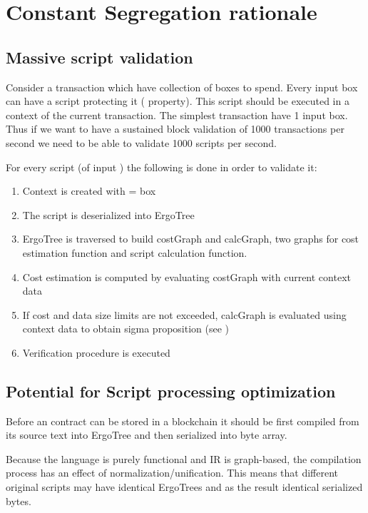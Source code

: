 \section{Constant Segregation rationale}

\subsection{Massive script validation}

Consider a transaction  which have  collection of boxes to
spend. Every input box can have a script protecting it (
property). This script should be executed in a context of the current
transaction. The simplest transaction have 1 input box. Thus if we want to
have a sustained block validation of 1000 transactions per second we need to
be able to validate 1000 scripts per second.

For every script (of input ) the following is done in order to
validate it:
\begin{enumerate}
    \item Context is created with  = box
    \item The script is deserialized into ErgoTree 
    \item ErgoTree is traversed to build costGraph and calcGraph, two graphs for
    cost estimation function and script calculation function.
    \item Cost estimation is computed by evaluating costGraph with current context data
    \item If cost and data size limits are not exceeded, calcGraph is
    evaluated using context data to obtain sigma proposition (see
    \hyperref[sec:type:SigmaProp]{})
    \item Verification procedure is executed
\end{enumerate}

\subsection{Potential for Script processing optimization}

Before an \langname contract can be stored in a blockchain it should be first
compiled from its source text into ErgoTree and then serialized into byte
array.

Because the language is purely functional and IR is graph-based, the
compilation process has an effect of normalization/unification. This means
that different original scripts may have identical ErgoTrees and as the
result identical serialized bytes.

